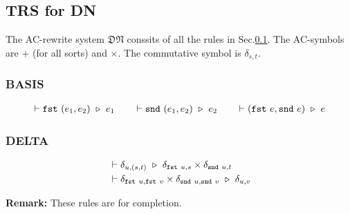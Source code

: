 \subsection{TRS for DN}
\label{sec: typed_dirac_rules}

\begin{definition} 
  The AC-rewrite system $\mathfrak{DN}$ conssits of all the rules in Sec.\ref{sec: typed_dirac_rules}.
  The AC-symbols are $+$ (for all sorts) and $\times$. The commutative symbol is $\delta_{s, t}$.
\end{definition}

\subsubsection*{\textsf{BASIS}}
\begin{align*}
    \vdash \texttt{fst}\ (e_1, e_2) \ \triangleright\  e_1
    \qquad
    \vdash \texttt{snd}\ (e_1, e_2) \ \triangleright\  e_2
    \qquad
    \vdash (\texttt{fst}\ e, \texttt{snd}\ e)\ \triangleright\  e
\end{align*}

\subsubsection*{\textsf{DELTA}}
\begin{align*}
  & \vdash \delta_{u, (s, t)} \ \triangleright\  \delta_{\texttt{fst}\ u, s} \times \delta_{\texttt{snd}\ u, t} \\
  & \vdash \delta_{\texttt{fst}\ u, \texttt{fst}\ v}\times\delta_{\texttt{snd}\ u, \texttt{snd}\ v} \ \triangleright\  \delta_{u, v}
\end{align*}

\textbf{Remark: } These rules are for completion.


